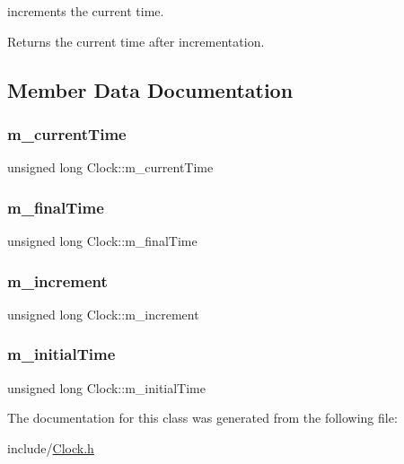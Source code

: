 increments the current time. \begin{DoxyReturn}{Returns}
the current time after incrementation. 
\end{DoxyReturn}


\subsection{Member Data Documentation}
\mbox{\label{class_clock_a73bf4edfc8f0fe2548ef6956f68b678e}} 
\subsubsection{\texorpdfstring{m\_currentTime}{m\_currentTime}}
{\footnotesize\ttfamily unsigned long Clock\+::m\+\_\+current\+Time\hspace{0.3cm}{\ttfamily [private]}}

\mbox{\label{class_clock_a5c473d84c1051d946ab5565060902840}} 
\subsubsection{\texorpdfstring{m\_finalTime}{m\_finalTime}}
{\footnotesize\ttfamily unsigned long Clock\+::m\+\_\+final\+Time\hspace{0.3cm}{\ttfamily [private]}}

\mbox{\label{class_clock_a2f940f0a30d58d1f7f36d0296463b9aa}} 
\subsubsection{\texorpdfstring{m\_increment}{m\_increment}}
{\footnotesize\ttfamily unsigned long Clock\+::m\+\_\+increment\hspace{0.3cm}{\ttfamily [private]}}

\mbox{\label{class_clock_a71afbea0f41f612e36d45ee2bb79ff0e}} 
\subsubsection{\texorpdfstring{m\_initialTime}{m\_initialTime}}
{\footnotesize\ttfamily unsigned long Clock\+::m\+\_\+initial\+Time\hspace{0.3cm}{\ttfamily [private]}}



The documentation for this class was generated from the following file\+:\begin{DoxyCompactItemize}
\item 
include/\mbox{\hyperlink{_clock_8h}{Clock.\+h}}\end{DoxyCompactItemize}
